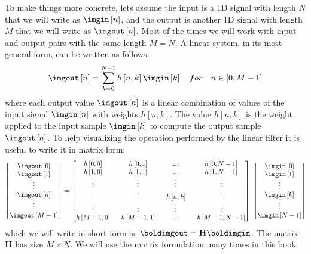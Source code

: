 To make things more concrete, lets assume the input is a 1D signal with length $N$ that we will write as $\imgin \left[n \right]$, and the output is another 1D signal with length $M$ that we will write as $\imgout \left[n \right]$. Most of the times we will work with input and output pairs with the same length $M=N$. A linear system, in its most general form, can be written as follows: 
\begin{equation}
\imgout \left[n \right] = \sum_{k=0}^{N-1} h \left[n,k\right] \imgin \left[k \right] ~~~ for ~~~ n \in \left[0, M-1 \right]
\label{eq:general_lin_filter}
\end{equation}
where each output value $\imgout \left[n \right]$ is a linear combination of values of the input signal $\imgin \left[n \right]$ with weights $h \left[n,k\right]$. The value $h \left[n,k\right]$ is the weight applied to the input sample $\imgin \left[k \right]$ to compute the output sample $\imgout \left[n \right]$.
To help visualizing the operation performed by the linear filter it is useful to write it in matrix form:
\begin{equation*}
\begin{bmatrix}
\imgout\left[ 0 \right] \\
\imgout\left[ 1 \right] \\
\vdots \\
\imgout\left[ n \right] \\
\vdots \\
\imgout\left[ M-1 \right]
\end{bmatrix}
 =
\begin{bmatrix}
  h\left[0,0\right] ~&~ h\left[0,1\right] ~&~ ... ~&~ h\left[0,N-1\right] \\
  h\left[1,0\right] ~&~ h\left[1,1\right] ~&~ ... ~&~ h\left[1,N-1\right] \\
  \vdots ~&~  \vdots ~&~  \vdots ~&~  \vdots \\
  \vdots ~&~  \vdots ~&~  h \left[n,k\right] ~&~  \vdots \\
\vdots ~&~  \vdots ~&~  \vdots ~&~  \vdots \\
  h\left[M-1,0\right] ~&~ h\left[M-1,1\right] ~&~ ... ~&~ h\left[M-1,N-1\right] 
 \end{bmatrix}
~
 \begin{bmatrix}
  \imgin\left[0\right] \\
  \imgin\left[1\right] \\
  \vdots \\
  \imgin\left[k\right] \\
  \vdots \\
  \imgin\left[N-1\right]
 \end{bmatrix}
\end{equation*}
which we will write in short form as $\boldimgout =  \mathbf{H} \boldimgin$. 
The matrix $\mathbf{H}$ has size $M \times N$.%
We will use the matrix formulation many times in this book. 

